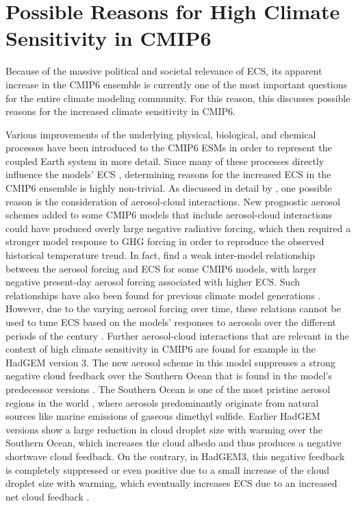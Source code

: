 \section{Possible Reasons for High Climate Sensitivity in \acs{CMIP}6}
\label{sec:04:possible_reasons_high_ecs_cmip6}

Because of the massive political and societal relevance of \ac{ECS}, its
apparent increase in the \acs{CMIP}6 ensemble is currently one of the most
important questions for the entire climate modeling community. For this reason,
this  discusses possible
reasons for the increased climate sensitivity in \acs{CMIP}6.

Various improvements of the underlying physical, biological, and chemical
processes have been introduced to the \acs{CMIP}6 \acp{ESM} in order to
represent the coupled Earth system in more detail. Since many of these
processes directly influence the models' \ac{ECS} \autocite{Forster2020},
determining reasons for the increased \ac{ECS} in the \acs{CMIP}6 ensemble is
highly non-trivial. As discussed in detail by \textcite{Meehl2020}, one
possible reason is the consideration of aerosol-cloud interactions. New
prognostic aerosol schemes added to some \acs{CMIP}6 models that include
aerosol-cloud interactions could have produced overly large negative radiative
forcing, which then required a stronger model response to \ac{GHG} forcing in
order to reproduce the observed historical temperature trend. In fact,
\textcite{Meehl2020} find a weak inter-model relationship between the aerosol
forcing and \ac{ECS} for some \acs{CMIP}6 models, with larger negative
present-day aerosol forcing associated with higher \ac{ECS}. Such relationships
have also been found for previous climate model generations
\autocite{Kiehl2007, Forster2013}. However, due to the varying aerosol forcing
over time, these relations cannot be used to tune \ac{ECS} based on the models'
responses to aerosols over the different periods of the  century
\autocite{Dittus2020}. Further aerosol-cloud interactions that are relevant in
the context of high climate sensitivity in \acs{CMIP}6 are found for example in
the \ac{HadGEM} version 3. The new aerosol scheme in this model suppresses a
strong negative cloud feedback over the Southern Ocean that is found in the
model's predecessor versions \autocite{BodasSalcedo2019}. The Southern Ocean is
one of the most pristine aerosol regions in the world \autocite{Hamilton2014},
where aerosols predominantly originate from natural sources like marine
emissions of gaseous dimethyl sulfide. Earlier \ac{HadGEM} versions show a
large reduction in cloud droplet size with warming over the Southern Ocean,
which increases the cloud albedo and thus produces a negative shortwave cloud
feedback. On the contrary, in \acs{HadGEM}3, this negative feedback is
completely suppressed or even positive due to a small increase of the cloud
droplet size with warming, which eventually increases \ac{ECS} due to an
increased net cloud feedback \autocite{BodasSalcedo2019}.

